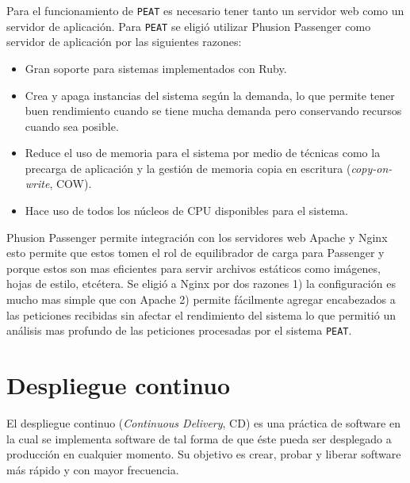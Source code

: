 Para el funcionamiento de \texttt{PEAT} es necesario tener tanto un servidor web
como un servidor de aplicación.
Para \texttt{PEAT} se eligió utilizar Phusion Passenger como servidor de aplicación
por las siguientes razones:

\begin{itemize}
\item Gran soporte para sistemas implementados con Ruby.
\item Crea y apaga instancias del sistema según la demanda, lo que permite tener
  buen rendimiento cuando se tiene mucha demanda pero conservando recursos cuando
  sea posible.
\item Reduce el uso de memoria para el sistema por medio de técnicas como
  la precarga de aplicación y la gestión de memoria copia en escritura
  (\textit{copy-on-write}, COW).
\item Hace uso de todos los núcleos de CPU disponibles para el sistema.
\end{itemize}

Phusion Passenger permite integración con los servidores web Apache y Nginx esto
permite que estos tomen el rol de equilibrador de carga para Passenger y porque
estos son mas eficientes para servir archivos estáticos como imágenes, hojas de
estilo, etcétera. Se eligió a Nginx por dos razones 1) la configuración es mucho
mas simple que con Apache 2) permite fácilmente agregar encabezados a las peticiones
recibidas sin afectar el rendimiento del sistema lo que permitió un análisis mas
profundo de las peticiones procesadas por el sistema \texttt{PEAT}.





\section{Despliegue continuo}

El despliegue continuo (\textit{Continuous Delivery}, CD) es una práctica de software
en la cual se implementa software de tal forma de que éste pueda ser desplegado a
producción en cualquier momento\cite{27_martin_fowler_cd}. Su objetivo es crear,
probar y liberar software más rápido y con mayor frecuencia.

\vspace{2.5mm}

